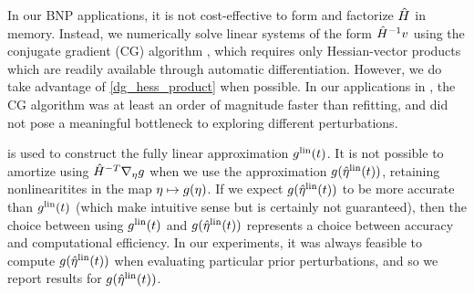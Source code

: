 In our BNP applications, it is not cost-effective to form and factorize
$\hat{H}$ in memory.  Instead, we numerically solve linear systems of the form
$\hat{H}^{-1} v$ using the conjugate gradient (CG) algorithm \citep[Chapter
5]{nocedal:2006:numerical}, which requires only Hessian-vector products which
are readily available through automatic differentiation.  However, we do take
advantage of \eqref{dg_hess_product} when possible. In our applications in
, the CG algorithm was at least an order of magnitude faster
than refitting, and did not pose a meaningful bottleneck to exploring different
perturbations.

 is used to construct the fully linear approximation
$g^{\mathrm{lin}}(t)$. It is not possible to amortize using $\hat{H}^{-T} \nabla_\eta g$
when we use the approximation $g(\hat\eta^{\mathrm{lin}}(t))$, retaining nonlinearitites in
the map $\eta \mapsto g(\eta)$.  If we expect $g(\hat\eta^{\mathrm{lin}}(t))$ to be more
accurate than $g^{\mathrm{lin}}(t)$ (which make intuitive sense but is certainly not
guaranteed), then the choice between using $g^{\mathrm{lin}}(t)$ and $g(\hat\eta^{\mathrm{lin}}(t))$
represents a choice between accuracy and computational efficiency.  In our
experiments, it was always feasible to compute $g(\hat\eta^{\mathrm{lin}}(t))$ when evaluating
particular prior perturbations, and so we report results for $g(\hat\eta^{\mathrm{lin}}(t))$.
